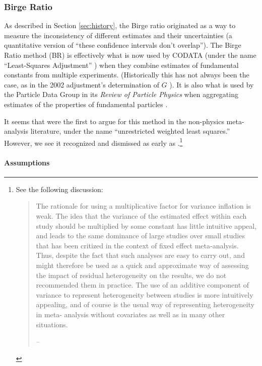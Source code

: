 \documentclass[12pt]{article}
\begin{document}
\subsubsection{Birge Ratio}\label{sec:birge}

As described in Section \ref{sec:history}, the Birge ratio originated as a way to measure the inconsistency of different estimates and their uncertainties (a quantitative version of ``these confidence intervals don't overlap''). The Birge Ratio method (BR) is effectively what is now used by CODATA (under the name ``Least-Squares Adjustment'' \citep{tiesinga2021codata}) when they combine estimates of fundamental constants from multiple experiments. (Historically this has not always been the case, as in the 2002 adjustment's determination of $G$ \citep{mohr2005codata}). It is also what is used by the Particle Data Group in its \emph{Review of Particle Physics} when aggregating estimates of the properties of fundamental particles \citep[Section 5.2.2]{navas2024review}.

It seems that \citet{stanley2015neither} were the first to argue for this method in the non-physics meta-analysis literature, under the name ``unrestricted weighted least squares.'' However, we see it recognized and dismissed as early as \citet{thompson1999explaining}.\footnote{See the following discussion:
  \begin{quote}
The rationale for using a multiplicative factor for variance inflation is weak. The idea that the
variance of the estimated effect within each study should be multiplied by some constant has little
intuitive appeal, and leads to the same dominance of large studies over small studies that has
been critized in the context of fixed effect meta-analysis. Thus, despite the fact that such
analyses are easy to carry out, and might therefore be used as a quick and approximate way of
assessing the impact of residual heterogeneity on the results, we do not recommended them in
practice. The use of an additive component of variance to represent heterogeneity between studies
is more intuitively appealing, and of course is the usual way of representing heterogeneity in meta-
analysis without covariates as well as in many other situations.

\hfill{-- \citet[pg. 2705]{thompson1999explaining}}
  \end{quote}
}



\paragraph{Assumptions}\label{assumptions-2}
\end{document}
